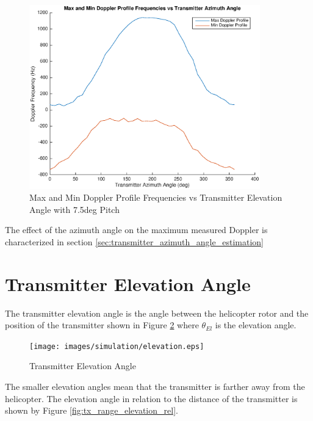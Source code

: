 \begin{figure}
	\begin{center}
		\includegraphics[width=10cm]{images/simulation/pitch_azimuth_rev.eps}
		\caption{Max and Min Doppler Profile Frequencies vs Transmitter Elevation Angle with 7.5deg Pitch}
		\label{fig:pitch_azimuth_rev}
	\end{center}
\end{figure}

The effect of the azimuth angle on the maximum measured Doppler is characterized in section \ref{sec:transmitter_azimuth_angle_estimation}

\section{Transmitter Elevation Angle} \label{sec:tea}
The transmitter elevation angle is the angle between the helicopter rotor and the position of the transmitter shown in Figure \ref{fig:azimuth_rel} where $\theta_{El}$ is the elevation angle. 

\begin{figure}
	\begin{center}
		\texttt{[image: images/simulation/elevation.eps]}
		\caption{Transmitter Elevation Angle}
		\label{fig:azimuth_rel}
	\end{center}
\end{figure}

The smaller elevation angles mean that the transmitter is farther away from the helicopter. The elevation angle in relation to the distance of the transmitter is shown by Figure \ref{fig:tx_range_elevation_rel}.

